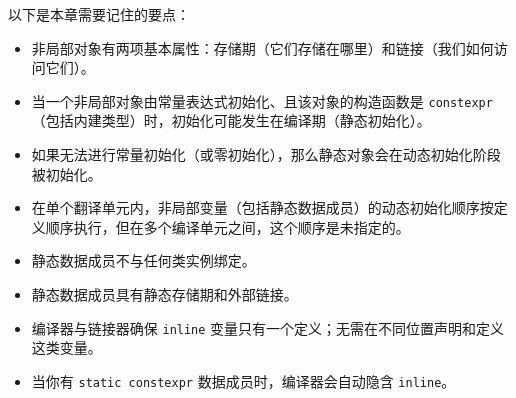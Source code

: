 以下是本章需要记住的要点：

\begin{itemize}
\item 非局部对象有两项基本属性：存储期（它们存储在哪里）和链接（我们如何访问它们）。
\item 当一个非局部对象由常量表达式初始化、且该对象的构造函数是 \texttt{constexpr}（包括内建类型）时，初始化可能发生在编译期（静态初始化）。
\item 如果无法进行常量初始化（或零初始化），那么静态对象会在动态初始化阶段被初始化。
\item 在单个翻译单元内，非局部变量（包括静态数据成员）的动态初始化顺序按定义顺序执行，但在多个编译单元之间，这个顺序是未指定的。
\item 静态数据成员不与任何类实例绑定。
\item 静态数据成员具有静态存储期和外部链接。
\item 编译器与链接器确保 \texttt{inline} 变量只有一个定义；无需在不同位置声明和定义这类变量。
\item 当你有 \texttt{static constexpr} 数据成员时，编译器会自动隐含 \texttt{inline}。
\end{itemize}
